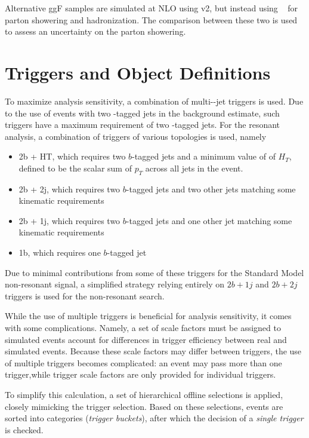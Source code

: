 Alternative ggF samples are simulated at NLO using \POWHEGBOX v2, but instead using \HERWIG[7]~\cite{Herwigpp} 
for parton showering and hadronization. The comparison between these two is used to assess an uncertainty 
on the parton showering.


\section{Triggers and Object Definitions}
\label{sec:trigger}
To maximize analysis sensitivity, a combination of multi-\Pqb-jet triggers is used. Due to the 
use of events with two \Pqb-tagged jets in the background estimate, such triggers have a maximum 
requirement of two \Pqb-tagged jets. For the resonant analysis, a combination of triggers of 
various topologies is used, namely
\begin{itemize}
	\item 2b + HT, which requires two $b$-tagged jets and a minimum value of of $H_{T}$, defined to be the scalar sum of $p_{T}$ across all jets in the event.
	\item 2b + 2j, which requires two $b$-tagged jets and two other jets matching some kinematic requirements
	\item 2b + 1j, which requires two $b$-tagged jets and one other jet matching some kinematic requirements
	\item 1b, which requires one $b$-tagged jet
\end{itemize}
Due to minimal contributions from some of these triggers for the Standard Model non-resonant signal, a simplified strategy relying entirely on $2b+1j$ and $2b+2j$ triggers is used for the non-resonant search.

While the use of multiple triggers is beneficial for analysis sensitivity, it comes with some
complications. Namely, a set of scale factors must be assigned to simulated events 
account for differences in trigger efficiency between real and simulated events. Because these scale 
factors may differ between triggers, the use of multiple triggers becomes complicated: an event may pass 
more than one trigger,while trigger scale factors are only provided for individual triggers.

To simplify this calculation, a set of hierarchical offline selections is applied, closely 
mimicking the trigger selection. Based on these selections, events are sorted into categories
(\emph{trigger buckets}), after which the decision of a \emph{single trigger} is checked. 

